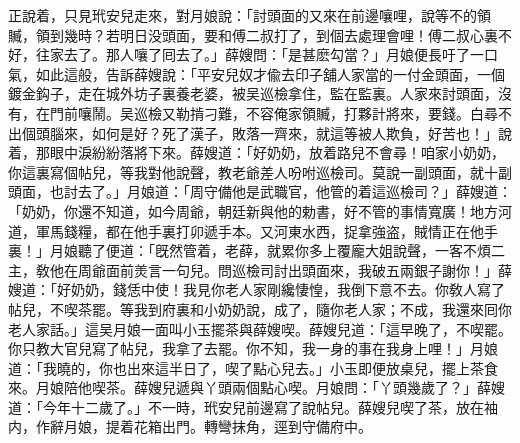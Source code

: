 正說着，只見玳安兒走來，對月娘說：「討頭面的又來在前邊嚷哩，說等不的領贓，領到幾時？若明日没頭面，要和傅二叔打了，到個去處理會哩！傅二叔心裏不好，往家去了。那人嚷了囘去了。」薛嫂問：「是甚麽勾當？」月娘便長吁了一口氣，如此這般，告訴薛嫂說：「平安兒奴才偸去印子舖人家當的一付金頭面，一個鍍金鈎子，走在城外坊子裏養老婆，被吴巡檢拿住，監在監裏。人家來討頭面，沒有，在門前嚷鬧。吴巡檢又勒掯刁難，不容俺家領贓，打夥計將來，要錢。白尋不出個頭腦來，如何是好？死了漢子，敗落一齊來，就這等被人欺負，好苦也！」說着，那眼中淚紛紛落將下來。薛嫂道：「好奶奶，放着路兒不會尋！咱家小奶奶，你這裏寫個帖兒，等我對他說聲，教老爺差人吩咐巡檢司。莫說一副頭面，就十副頭面，也討去了。」月娘道：「周守備他是武職官，他管的着這巡檢司？」薛嫂道：「奶奶，你還不知道，如今周爺，朝廷新與他的勅書，好不管的事情寬廣！地方河道，軍馬錢糧，都在他手裏打卯遞手本。又河東水西，捉拿強盗，賊情正在他手裏！」月娘聽了便道：「旣然管着，老薛，就累你多上覆龐大姐說聲，一客不煩二主，敎他在周爺面前羙言一句兒。問巡檢司討出頭面來，我破五兩銀子謝你！」薛嫂道：「好奶奶，錢恁中使！我見你老人家剛纔悽惶，我倒下意不去。你敎人寫了帖兒，不喫茶罷。等我到府裏和小奶奶說，成了，隨你老人家；不成，我還來囘你老人家話。」這吴月娘一面叫小玉擺茶與薛嫂喫。薛嫂兒道：「這早晚了，不喫罷。你只教大官兒寫了帖兒，我拿了去罷。你不知，我一身的事在我身上哩！」月娘道：「我曉的，你也出來這半日了，喫了點心兒去。」小玉即便放桌兒，擺上茶食來。月娘陪他喫茶。薛嫂兒遞與丫頭兩個點心喫。月娘問：「丫頭幾歲了？」薛嫂道：「今年十二歲了。」不一時，玳安兒前邊寫了說帖兒。薛嫂兒喫了茶，放在袖内，作辭月娘，提着花箱出門。轉彎抹角，逕到守備府中。


